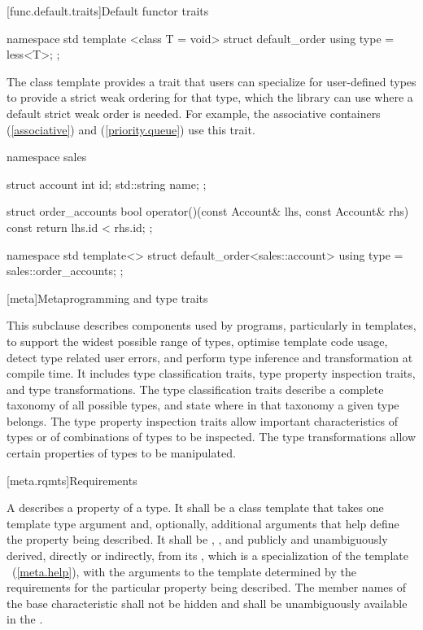 [func.default.traits]{Default functor traits}

%
\begin{codeblock}
namespace std {
  template <class T = void>
  struct default_order {
    using type = less<T>;
  };
}
\end{codeblock}

\pnum
The class template  provides a trait that users can
specialize for user-defined types to provide a strict weak ordering for that
type, which the library can use where a default strict weak order is needed.
For example, the associative containers (\ref{associative}) and
 (\ref{priority.queue}) use this trait.

\pnum
\begin{example}
\begin{codeblock}
namespace sales {
  struct account {
    int id;
    std::string name;
  };

  struct order_accounts {
    bool operator()(const Account& lhs, const Account& rhs) const {
      return lhs.id < rhs.id;
    }
  };
}

namespace std {
  template<>
  struct default_order<sales::account> {
    using type = sales::order_accounts;
  };
}
\end{codeblock}
\end{example}

[meta]{Metaprogramming and type traits}

\pnum
This subclause describes components used by \Cpp programs, particularly in
templates, to support the widest possible range of types, optimise
template code usage, detect type related user errors, and perform
type inference and transformation at compile time. It includes type
classification traits, type property inspection traits, and type
transformations. The type classification traits describe a complete taxonomy
of all possible \Cpp types, and state where in that taxonomy a given
type belongs. The type property inspection traits allow important
characteristics of types or of combinations of types to be inspected. The
type transformations allow certain properties of types to be manipulated.

[meta.rqmts]{Requirements}

\pnum
A  describes a property
of a type. It shall be a class template that takes one template type
argument and, optionally, additional arguments that help define the
property being described. It shall be ,
,
and publicly and unambiguously derived, directly or indirectly, from
its , which is
a specialization of the template
~(\ref{meta.help}), with
the arguments to the template  determined by the
requirements for the particular property being described.
The member names of the base characteristic shall not be hidden and shall be
unambiguously available in the .

